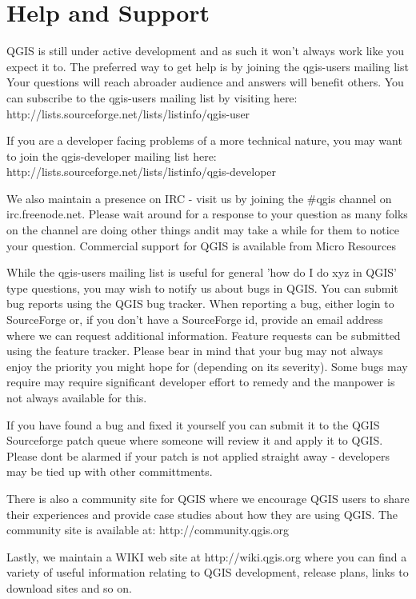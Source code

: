 \chapter{Help and Support}

QGIS is still under active development and as such it won't always work like you expect it to.
The preferred way to get help is by joining the qgis-users mailing list Your questions will reach abroader audience and answers will benefit others. You can subscribe to the qgis-users mailing list by visiting here: http://lists.sourceforge.net/lists/listinfo/qgis-user

If you are a developer facing problems of a more technical nature, you may want to join the qgis-developer mailing list here: http://lists.sourceforge.net/lists/listinfo/qgis-developer

We also maintain a presence on IRC - visit us by joining the \#qgis channel on irc.freenode.net. Please wait around for a response to your question as many folks on the channel are doing other things andit may take a while for them to notice your question.
Commercial support for QGIS is available from Micro Resources 

While the qgis-users mailing list is useful for general 'how do I do xyz in QGIS' type questions, you may wish to notify us about bugs in QGIS. You can submit bug reports using the QGIS bug tracker. When reporting a bug, either login to SourceForge or, if you don't have a SourceForge id, provide an email address where we can request additional information.
Feature requests can be submitted using the feature tracker. Please bear in mind that your bug may not always enjoy the priority you might hope for (depending on its severity). Some bugs may require may require significant developer effort to remedy and the manpower is not always available for this.

If you have found a bug and fixed it yourself you can submit it to the QGIS Sourceforge patch queue where someone will review it and apply it to QGIS. Please dont be alarmed if your patch is not applied straight away - developers may be tied up with other committments.

There is also a community site for QGIS where we encourage QGIS users to share their experiences and provide case studies about how they are using QGIS. The community site is available at: http://community.qgis.org 

Lastly, we maintain a WIKI web site at http://wiki.qgis.org where you can find a variety of useful information relating to QGIS development, release plans, links to download sites and so on.